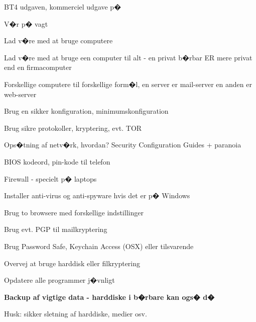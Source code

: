 \documentclass[20pt,landscape,a4paper,footrule]{foils}
\begin{document}


BT4 udgaven, kommerciel udgave p� 




\centerline{V�r p� vagt}


\begin{list1}
\item Lad v�re med at bruge computere
\item Lad v�re med at bruge een computer til alt - en privat b�rbar ER mere privat end en firmacomputer
\item Forskellige computere til forskellige form�l, en server er mail-server en anden er web-server
\item Brug en sikker konfiguration, minimumskonfiguration
\item Brug sikre protokoller, kryptering, evt. TOR
\item Ops�tning af netv�rk, hvordan? Security Configuration Guides + paranoia
\begin{list2}
\item {}
\item {}
\item {}
\end{list2}
\end{list1}



\begin{list2}
\item BIOS kodeord, pin-kode til telefon
\item Firewall - specielt p� laptops
\item Installer anti-virus og anti-spyware hvis det er p� Windows
\item Brug to browsere med forskellige indstillinger
\item Brug evt. PGP til mailkryptering
\item Brug Password Safe, Keychain Access (OSX) eller tilsvarende
\item Overvej at bruge harddisk eller filkryptering
\item Opdatere alle programmer j�vnligt
\item {\bf Backup af vigtige data - harddiske i b�rbare kan ogs� d�}
\item Husk: sikker sletning af harddiske, medier osv.
\end{list2}
\end{document}
